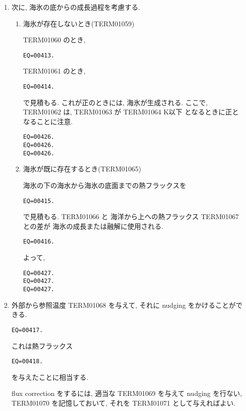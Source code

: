 \begin{enumerate}
\item 次に, 海氷の底からの成長過程を考慮する.

\begin{enumerate}
\item 海氷が存在しないとき(TERM01059)

TERM01060 のとき, 
\begin{verbatim}
EQ=00413.
\end{verbatim}
TERM01061 のとき, 
\begin{verbatim}
EQ=00414.
\end{verbatim}
で見積もる.
これが正のときには, 海氷が生成される.
ここで,  TERM01062 は, TERM01063 が TERM01064 K以下
となるときに正となることに注意.
\begin{verbatim}
EQ=00426.
EQ=00426.
EQ=00426.
\end{verbatim}

\item 海氷が既に存在するとき(TERM01065)

海氷の下の海水から海氷の底面までの熱フラックスを
\begin{verbatim}
EQ=00415.
\end{verbatim}
で見積もる.
TERM01066 と 海洋から上への熱フラックス TERM01067 との差が
海氷の成長または融解に使用される.
\begin{verbatim}
EQ=00416.
\end{verbatim}
よって,
\begin{verbatim}
EQ=00427.
EQ=00427.
EQ=00427.
\end{verbatim}
\end{enumerate}

\item 外部から参照温度 TERM01068 を与えて,
      それに nudging をかけることができる.
%      
      \begin{verbatim}
EQ=00417.
\end{verbatim}
%
      これは熱フラックス 
      \begin{verbatim}
EQ=00418.
\end{verbatim}
      を与えたことに相当する.

      flux correction をするには,
      適当な TERM01069 を与えて nudging を行ない,
      TERM01070 を記憶しておいて,
      それを TERM01071 として与えればよい.

\end{enumerate}



